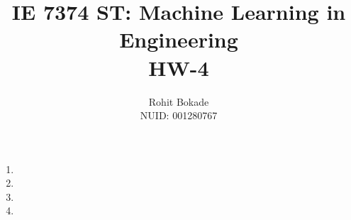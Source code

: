 \documentclass[11pt]{article}
\title{IE 7374 ST: Machine Learning in Engineering \\ HW-4}
\author{Rohit Bokade \\ NUID: 001280767}
\begin{document}
	
	\maketitle 
	\begin{enumerate}
		\item 
		\item 
		\item 
		\item 	
	\end{enumerate}	 
	
\end{document}
